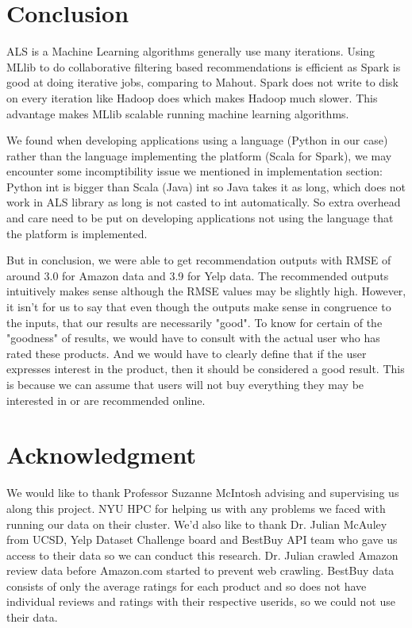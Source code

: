 \documentclass[conference]{IEEEtran}
\begin{document}
\section{Conclusion}

ALS is a Machine Learning algorithms generally use many iterations. Using MLlib to do collaborative filtering based recommendations is efficient as Spark is good at doing iterative jobs, comparing to Mahout. Spark does not write to disk on every iteration like Hadoop does which makes Hadoop much slower. This advantage makes MLlib scalable running machine learning algorithms. 

We found when developing applications using a language (Python in our case) rather than the language implementing the platform (Scala for Spark), we may encounter some incomptibility issue we mentioned in implementation section: Python int is bigger than Scala (Java) int so Java takes it as long, which does not work in ALS library as long is not casted to int automatically. So extra overhead and care need to be put on developing applications not using the language that the platform is implemented. 

But in conclusion, we were able to get recommendation outputs with RMSE of around 3.0 for Amazon data and 3.9 for Yelp data.  The recommended outputs intuitively makes sense although the RMSE values may be slightly high.  However, it isn't for us to say that even though the outputs make sense in congruence to the inputs, that our results are necessarily "good".  To know for certain of the "goodness" of results, we would have to consult with the actual user who has rated these products.  And we would have to clearly define that if the user expresses interest in the product, then it should be considered a good result.  This is because we can assume that users will not buy everything they may be interested in or are recommended online.  

\section*{Acknowledgment}

We would like to thank Professor Suzanne McIntosh advising and supervising us along this project. NYU HPC for helping us with any problems we faced with running our data on their cluster. We'd also like to thank Dr. Julian McAuley from UCSD, Yelp Dataset Challenge board \cite{YelpDataset} and BestBuy API team who gave us access to their data so we can conduct this research. Dr. Julian crawled Amazon review data before Amazon.com started to prevent web crawling. BestBuy data consists of only the average ratings for each product and so does not have individual reviews and ratings with their respective userids, so we could not use their data. 
\end{document}

